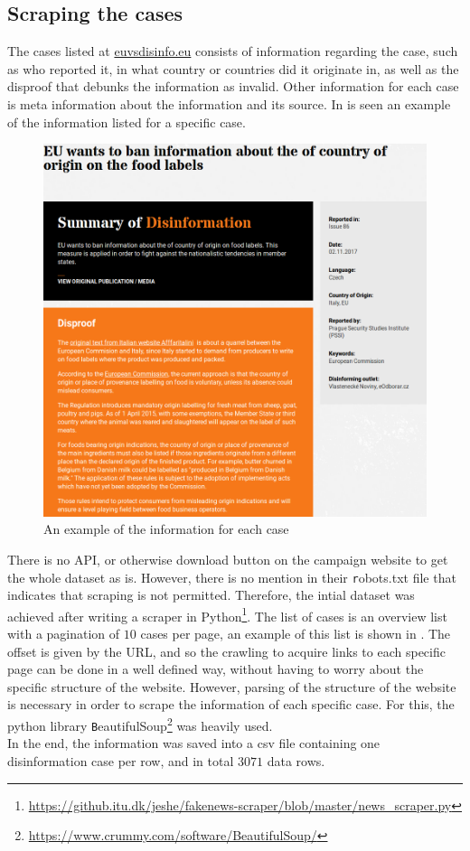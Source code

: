 \documentclass{article}
\begin{document}
\subsection{Scraping the cases}
The cases listed at \href{https://www.euvsdisinfo.eu}{euvsdisinfo.eu} consists of information regarding the case, such as who reported it, in what country or countries did it originate in, as well as the disproof that debunks the information as invalid. Other information for each case is meta information about the information and its source. In  is seen an example of the information listed for a specific case.
\begin{figure}[H]
    \centering
    \caption{An example of the information for each case}
    \label{fig:single_case}
    \includegraphics[width=.9\textwidth]{images/example_fakenews.png}
\end{figure}
There is no API, or otherwise download button on the campaign website to get the whole dataset as is. However, there is no mention in their {\texttt robots.txt} file that indicates that scraping is not permitted. Therefore, the intial dataset was achieved after writing a scraper in Python\footnote{\url{https://github.itu.dk/jeshe/fakenews-scraper/blob/master/news_scraper.py}}. The list of cases is an overview list with a pagination of $10$ cases per page, an example of this list is shown in . The offset is given by the URL, and so the crawling to acquire links to each specific page can be done in a well defined way, without having to worry about the specific structure of the website.
However, parsing of the structure of the website is necessary in order to scrape the information of each specific case. For this, the python library {\texttt BeautifulSoup}\footnote{\url{https://www.crummy.com/software/BeautifulSoup/}} was heavily used.\\
In the end, the information was saved into a csv file containing one disinformation case per row, and in total $3071$ data rows.
\end{document}

